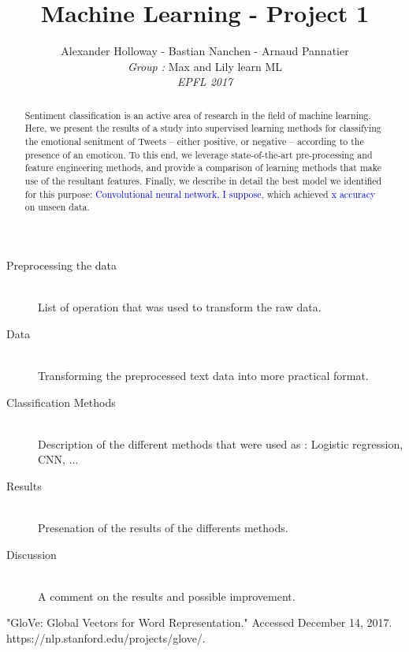 \documentclass[10pt,conference,compsocconf]{IEEEtran}
\begin{document}
\title{Machine Learning - Project 1}
\author{
 Alexander Holloway - Bastian Nanchen - Arnaud Pannatier 
  \\
  \textit{Group : }Max and Lily learn ML \\
  \textit{EPFL 2017}
}
\maketitle

\begin{abstract}
Sentiment classification is an active area of research in the field of machine learning. Here, we present the results of a study into supervised learning methods for classifying the emotional senitment of Tweets -- either positive, or negative -- according to the presence of an emoticon. To this end, we leverage state-of-the-art pre-processing and feature engineering methods, and provide a comparison of learning methods that make use of the resultant features. Finally, we describe in detail the best model we identified for this purpose: \textcolor{blue}{Convolutional neural network, I suppose}, which achieved \textcolor{blue}{x accuracy} on unseen data.
\end{abstract}

\begin{description}
\item[Preprocessing the data] \ \\
List of operation that was used to transform the raw data.
\item[Data] \ \\
Transforming the preprocessed text data into more practical format. 
\item[Classification Methods] \ \\
Description of the different methods that were used as : Logistic regression, CNN, ...
\item[Results] \ \\
Presenation of the results of the differents methods.
\item[Discussion] \ \\
 A comment on the results and possible improvement.  
\end{description}










\begin{thebibliography}{9}
"GloVe: Global Vectors for Word Representation." Accessed December 14, 2017.
https://nlp.stanford.edu/projects/glove/.
\end{thebibliography}
\end{document}
